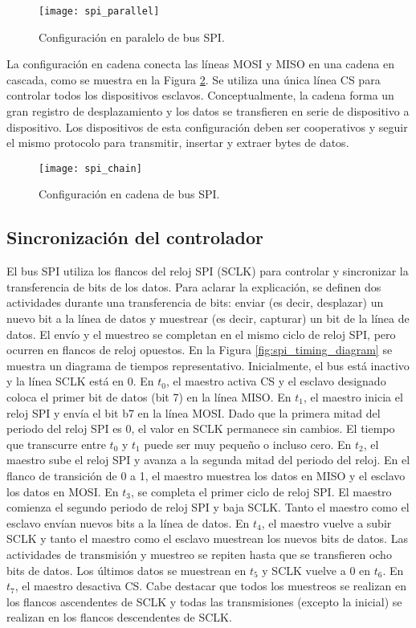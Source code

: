     \begin{figure}[hbtp]
      \centering
      \texttt{[image: spi\_parallel]}
      \caption{Configuración en paralelo de bus SPI.}
      \label{fig:spi_parallel}
    \end{figure}    

    La configuración en cadena conecta las líneas MOSI y MISO en una cadena en cascada, como se muestra en la Figura \ref{fig:spi_chain}. Se utiliza una única línea CS para controlar todos los dispositivos esclavos. Conceptualmente, la cadena forma un gran registro de desplazamiento y los datos se transfieren en serie de dispositivo a dispositivo. Los dispositivos de esta configuración deben ser cooperativos y seguir el mismo protocolo para transmitir, insertar y extraer bytes de datos.

    \begin{figure}[hbtp]
      \centering
      \texttt{[image: spi\_chain]}
      \caption{Configuración en cadena de bus SPI.}
      \label{fig:spi_chain}
    \end{figure}    


    \subsection{Sincronización del controlador}

    El bus SPI utiliza los flancos del reloj SPI (SCLK) para controlar y sincronizar la transferencia de bits de los datos. Para aclarar la explicación, se definen dos actividades durante una transferencia de bits: enviar (es decir, desplazar) un nuevo bit a la línea de datos y muestrear (es decir, capturar) un bit de la línea de datos. El envío y el muestreo se completan en el mismo ciclo de reloj SPI, pero ocurren en flancos de reloj opuestos.
    En la Figura \ref{fig:spi_timing_diagram} se muestra un diagrama de tiempos representativo. Inicialmente, el bus está inactivo y la línea SCLK está en 0. En $t_{0}$, el maestro activa CS y el esclavo designado coloca el primer bit de datos (bit 7) en la línea MISO. En $t_{1}$, el maestro inicia el reloj SPI y envía el bit b7 en la línea MOSI.
Dado que la primera mitad del periodo del reloj SPI es 0, el valor en SCLK permanece sin cambios. El tiempo que transcurre entre $t_{0}$ y $t_{1}$ puede ser muy pequeño o incluso cero. En $t_{2}$, el maestro sube el reloj SPI y avanza a la segunda mitad del periodo del reloj. En el flanco de transición de 0 a 1, el maestro muestrea los datos en MISO y el esclavo los datos en MOSI. 
     En $t_{3}$, se completa el primer ciclo de reloj SPI. El maestro comienza el segundo periodo de reloj SPI y baja SCLK. Tanto el maestro como el esclavo envían nuevos bits a la línea de datos. En $t_{4}$, el maestro vuelve a subir SCLK y tanto el maestro como el esclavo muestrean los nuevos bits de datos. Las actividades de transmisión y muestreo se repiten hasta que se transfieren ocho bits de datos. Los últimos datos se muestrean en $t_{5}$ y SCLK vuelve a 0 en $t_{6}$. En $t_{7}$, el maestro desactiva CS. Cabe destacar que todos los muestreos se realizan en los flancos ascendentes de SCLK y todas las transmisiones (excepto la inicial) se realizan en los flancos descendentes de SCLK.

